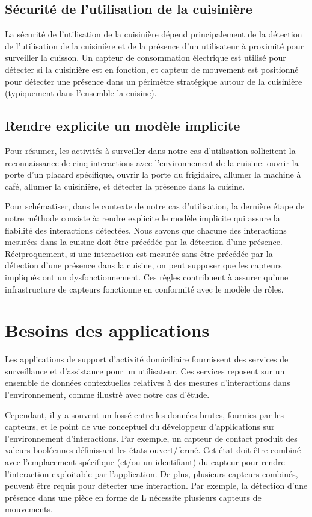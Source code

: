 \subsection{Sécurité de l'utilisation de la cuisinière}
La sécurité de l'utilisation de la cuisinière dépend principalement de la détection de l'utilisation de la cuisinière et de la présence d'un utilisateur à proximité pour surveiller la cuisson. Un capteur de consommation électrique est utilisé pour détecter si la cuisinière est en fonction, et capteur de mouvement est positionné pour détecter une présence dans un périmètre stratégique autour de la cuisinière (typiquement dans l'ensemble la cuisine).

\subsection{Rendre explicite un modèle implicite}
Pour résumer, les activités à surveiller dans notre cas d'utilisation sollicitent la reconnaissance de cinq interactions avec l'environnement de la cuisine: ouvrir la porte d'un placard spécifique, ouvrir la porte du frigidaire, allumer la machine à café, allumer la cuisinière, et détecter la présence dans la cuisine.

Pour schématiser, dans le contexte de notre cas d'utilisation, la dernière étape de notre méthode consiste à: rendre explicite le modèle implicite qui assure la fiabilité des interactions détectées. Nous savons que chacune des interactions mesurées dans la cuisine doit être précédée par la détection d'une présence. Réciproquement, si une interaction est mesurée sans être précédée par la détection d'une présence dans la cuisine, on peut supposer que les capteurs impliqués ont un dysfonctionnement. Ces règles contribuent à assurer qu'une infrastructure de capteurs fonctionne en conformité avec le modèle de rôles.

\section{Besoins des applications}
Les applications de support d'activité domiciliaire fournissent des services de surveillance et d'assistance pour un utilisateur. Ces services reposent sur un ensemble de données contextuelles relatives à des mesures d'interactions dans l'environnement, comme illustré avec notre cas d'étude.

Cependant, il y a souvent un fossé entre les données brutes, fournies par les capteurs, et le point de vue conceptuel du développeur d'applications sur l'environnement d'interactions. Par exemple, un capteur de contact produit des valeurs booléennes définissant les états ouvert/fermé. Cet état doit être combiné avec l'emplacement spécifique (et/ou un identifiant) du capteur pour rendre l'interaction exploitable par l'application. De plus, plusieurs capteurs combinés, peuvent être requis pour détecter une interaction. Par exemple, la détection d'une présence dans une pièce en forme de L nécessite plusieurs capteurs de mouvements.

